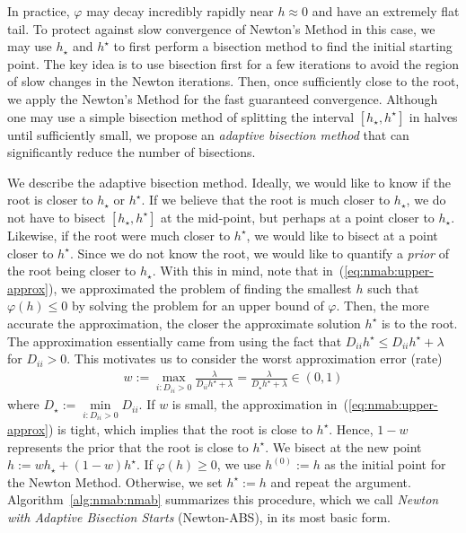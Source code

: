 In practice, $\varphi$ may decay incredibly rapidly near $h \approx 0$ and have an extremely flat tail.
To protect against slow convergence of Newton's Method in this case,
we may use $h_\star$ and $h^\star$ to first perform a bisection method to find the initial starting point.
The key idea is to use bisection first for a few iterations 
to avoid the region of slow changes in the Newton iterations.
Then, once sufficiently close to the root, we apply the Newton's Method for the fast guaranteed convergence.
Although one may use a simple bisection method of splitting the interval $[h_\star, h^\star]$ in halves
until sufficiently small, we propose an \emph{adaptive bisection method} 
that can significantly reduce the number of bisections.

We describe the adaptive bisection method.
Ideally, we would like to know if the root is closer to $h_\star$ or $h^\star$.
If we believe that the root is much closer to $h_\star$,
we do not have to bisect $[h_\star, h^\star]$ at the mid-point, 
but perhaps at a point closer to $h_\star$.
Likewise, if the root were much closer to $h^\star$, 
we would like to bisect at a point closer to $h^\star$.
Since we do not know the root, we would like to quantify a \emph{prior} of 
the root being closer to $h_\star$.
With this in mind, note that in~(\ref{eq:nmab:upper-approx}), we 
approximated the problem of finding the smallest $h$ such that $\varphi(h) \leq 0$
by solving the problem for an upper bound of $\varphi$.
Then, the more accurate the approximation, the closer the approximate solution $h^\star$ is to the root.
The approximation essentially came from using the fact that $D_{ii} h^\star \leq D_{ii} h^\star + \lambda$
for $D_{ii} > 0$.
This motivates us to consider the worst approximation error (rate)
\begin{align*}
    w
    := 
    \max\limits_{i: D_{ii} > 0} \frac{\lambda}{D_{ii} h^\star + \lambda}
    =
    \frac{\lambda}{D_\star h^\star + \lambda}
    \in 
    (0,1)
\end{align*}
where $D_\star := \min\limits_{i : D_{ii} > 0} D_{ii}$.
If $w$ is small, the approximation in~(\ref{eq:nmab:upper-approx}) is tight,
which implies that the root is close to $h^\star$.
Hence, $1-w$ represents the prior that the root is close to $h^\star$.
We bisect at the new point $h := wh_\star + (1-w)h^\star$.
If $\varphi(h) \geq 0$, we use $h^{(0)} := h$ as the initial point for the Newton Method.
Otherwise, we set $h^\star := h$ and repeat the argument.
Algorithm~\ref{alg:nmab:nmab} summarizes this procedure,
which we call \emph{Newton with Adaptive Bisection Starts} (Newton-ABS), 
in its most basic form.

